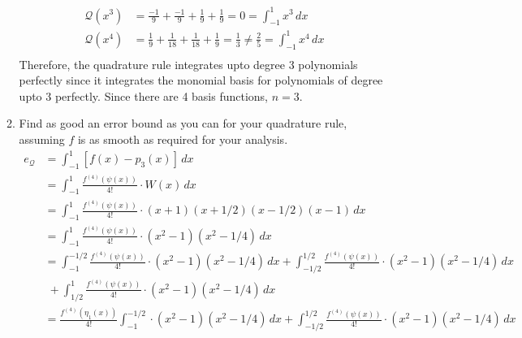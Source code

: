 \documentclass{article}
\begin{document}
\begin{enumerate}
\begin{enumerate}
\begin{align*}
                \mathcal{Q}(x^3) &= \frac{-1}{9} + \frac{-1}{9} + \frac{1}{9} + \frac{1}{9} = 0 = \int_{-1}^1 x^3 \, dx\\
                \mathcal{Q}(x^4) &= \frac{1}{9} + \frac{1}{18} + \frac{1}{18} + \frac{1}{9} = \frac{1}{3} \not = \frac{2}{5} = \int_{-1}^1 x^4 \, dx \\
            \end{align*} 
            Therefore, the quadrature rule integrates upto degree 3 polynomials perfectly since it integrates the monomial basis for polynomials of degree upto 3 perfectly. Since there are 4 basis functions, $n = 3$.
            \item Find as good an error bound as you can for your quadrature rule, assuming $f$ is as smooth as required for your analysis.
            \begin{align*}
                e_{\mathcal{Q}} &= \int_{-1}^1 [f(x) - p_3(x)] \, dx \\
                &= \int_{-1}^1 \frac{f^{(4)}(\psi(x))}{4!} \cdot W(x) \, dx \\
                &= \int_{-1}^1 \frac{f^{(4)}(\psi(x))}{4!} \cdot (x + 1)(x + 1/2)(x - 1/2)(x - 1) \, dx \\
                &= \int_{-1}^1 \frac{f^{(4)}(\psi(x))}{4!} \cdot (x^2 - 1)(x^2 - 1/4) \, dx \\
                &= \int_{-1}^{-1/2} \frac{f^{(4)}(\psi(x))}{4!} \cdot (x^2 - 1)(x^2 - 1/4) \, dx + \int_{-1/2}^{1/2} \frac{f^{(4)}(\psi(x))}{4!} \cdot (x^2 - 1)(x^2 - 1/4) \, dx \\
                &\; + \int_{1/2}^{1} \frac{f^{(4)}(\psi(x))}{4!} \cdot (x^2 - 1)(x^2 - 1/4) \, dx \\
                &= \frac{f^{(4)}(\eta_1(x))}{4!} \int_{-1}^{-1/2} \cdot (x^2 - 1)(x^2 - 1/4) \, dx + \int_{-1/2}^{1/2} \frac{f^{(4)}(\psi(x))}{4!} \cdot (x^2 - 1)(x^2 - 1/4) \, dx \\
            \end{align*} 
        \end{enumerate}
\end{enumerate}
\end{document}

